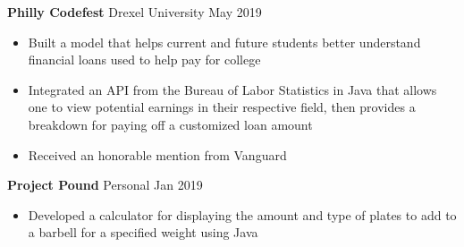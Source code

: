\documentclass[10pt]{article}
\newcommand{\resumesection}[1]{\vspace{-0.2cm}\section*{#1}\vspace{-0.2cm}\hrule\vspace{0.2cm}}
\begin{document}
\textbf{Philly Codefest} Drexel University \hfill May 2019\par
\begin{itemize}
	\item Built a model that helps current and future students better understand financial loans used to help pay for college
	\item Integrated an API from the Bureau of Labor Statistics in Java that allows one to view potential earnings in their respective field, then provides a breakdown for paying off a customized loan amount
	\item Received an honorable mention from Vanguard
\end{itemize}

\textbf{Project Pound} Personal \hfill Jan 2019\par
\begin{itemize}
	\item Developed a calculator for displaying the amount and type of plates to add to a barbell for a specified weight using Java
\end{itemize}



%
%
\end{document}
